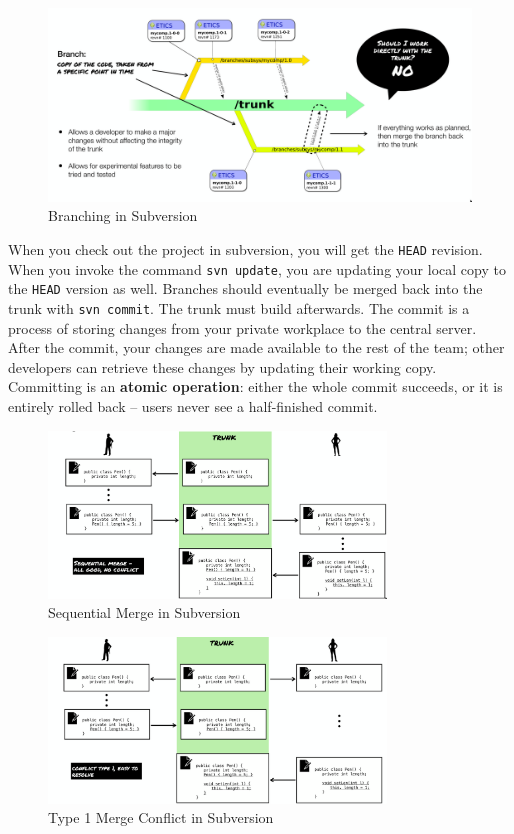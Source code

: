 \documentclass[a4paper,11pt]{article}
\begin{document}
\begin{figure}[H]
    \centering
    \includegraphics[width=\textwidth]{images/svn_branch.png}
    \caption{Branching in Subversion}
\end{figure}

When you check out the project in subversion, you will get the \verb|HEAD| revision.
When you invoke the command \texttt{svn update}, you are updating your local copy to the \verb|HEAD| version
as well.
Branches should eventually be merged back into the trunk with \texttt{svn commit}.
The trunk must build afterwards.
The commit is a process of storing changes from your private workplace to the central server.
After the commit, your changes are made available to the rest of the team;
other developers can retrieve these changes by updating their working copy.
Committing is an \textbf{atomic operation}: either the whole commit succeeds, or it is entirely rolled back -- users never
see a half-finished commit.

\begin{figure}[H]
    \centering
    \includegraphics[width=0.8\textwidth]{images/svn_sequential_merge.png}
    \caption{Sequential Merge in Subversion}
\end{figure}

\begin{figure}[H]
    \centering
    \includegraphics[width=0.8\textwidth]{images/svn_conflict1.png}
    \caption{Type 1 Merge Conflict in Subversion}
\end{figure}
\end{document}
